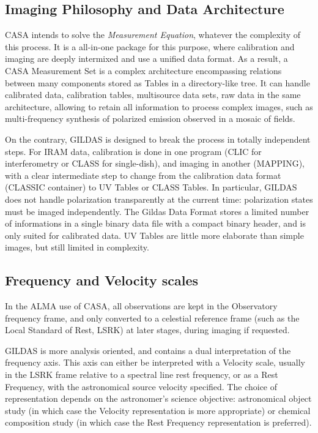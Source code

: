 \documentclass[11pt]{article}
\begin{document}
\subsection{Imaging Philosophy and Data Architecture}
CASA intends to solve the \textit{Measurement Equation}, whatever the
complexity of this process.  It is a all-in-one package for this purpose,
where calibration and imaging are deeply intermixed and use a
unified data format.
As a result, a CASA Measurement Set is a complex architecture
encompassing relations between many components stored as Tables
in a directory-like tree. It can handle calibrated data, calibration
tables, multisource data sets, raw data in the same architecture,
allowing to retain all information to process complex images, such
as multi-frequency synthesis of polarized emission observed in
a mosaic of fields.

On the contrary, GILDAS is designed to break the process in 
totally independent steps. For IRAM data, calibration is done
in one program (CLIC for interferometry or CLASS for single-dish),
and imaging in another (MAPPING), with a clear intermediate step
to change from the calibration data format (CLASSIC container)
to UV Tables or CLASS Tables. In particular, GILDAS does not
handle polarization transparently at the current time: 
polarization states must be imaged independently.
The Gildas Data Format stores a limited
number of informations in a single binary data file with a compact binary
header, and is only suited for calibrated data.  UV Tables
are little more elaborate than simple images, but still limited
in complexity. 

\subsection{Frequency and Velocity scales}
In the ALMA use of CASA, all observations are kept in the Observatory
frequency frame, and only converted to  a celestial reference frame
(such as the Local Standard of Rest, LSRK) at later stages, during
imaging if requested.

GILDAS is more analysis oriented, and contains a dual interpretation 
of the frequency axis.  This axis can either be interpreted with
a Velocity scale, usually in the LSRK frame relative to a spectral
line rest frequency, or as a Rest Frequency, with the astronomical
source velocity specified. The choice of representation depends
on the astronomer's science objective:  astronomical object study
(in which case the Velocity representation is more appropriate)
or chemical composition study (in which case the Rest Frequency
representation is preferred).
\end{document}
